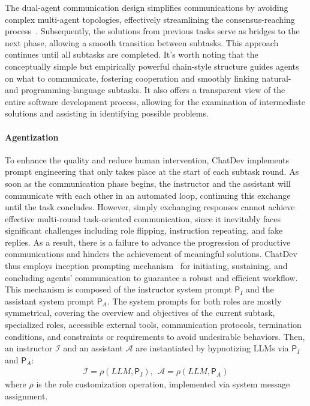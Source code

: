 \documentclass[11pt]{article}
\begin{document}
The dual-agent communication design simplifies communications by avoiding complex multi-agent topologies, effectively streamlining the consensus-reaching process~\cite{yin-etal-2023-exchange,chen2023agentverse}.
Subsequently, the solutions from previous tasks serve as bridges to the next phase, allowing a smooth transition between subtasks. This approach continues until all subtasks are completed.
It's worth noting that the conceptually simple but empirically powerful chain-style structure guides agents on what to communicate, fostering cooperation and smoothly linking natural- and programming-language subtasks.
It also offers a transparent view of the entire software development process, allowing for the examination of intermediate solutions and assisting in identifying possible problems.

\paragraph{Agentization}
To enhance the quality and reduce human intervention, ChatDev implements prompt engineering that only takes place at the start of each subtask round. As soon as the communication phase begins, the instructor and the assistant will communicate with each other in an automated loop, continuing this exchange until the task concludes.
However, simply exchanging responses cannot achieve effective multi-round task-oriented communication, since it inevitably faces significant challenges including role flipping, instruction repeating, and fake replies.
As a result, there is a failure to advance the progression of productive communications and hinders the achievement of meaningful solutions.
ChatDev thus employs inception prompting mechanism~\cite{li2023camel} for initiating, sustaining, and concluding agents' communication to guarantee a robust and efficient workflow.
This mechanism is composed of the instructor system prompt $\mathsf{P}_I$ and the assistant system prompt $\mathsf{P}_A$.
The system prompts for both roles are mostly symmetrical, covering the overview and objectives of the current subtask, specialized roles, accessible external tools, communication protocols, termination conditions, and constraints or requirements to avoid undesirable behaviors.
Then, an instructor $\mathcal{I}$ and an assistant $\mathcal{A}$ are instantiated by hypnotizing LLMs via $\mathsf{P}_I$ and $\mathsf{P}_A$:
\begin{equation}
\begin{aligned}
\mathcal{I} = \rho(LLM, \mathsf{P}_I), \ \ \mathcal{A} = \rho(LLM, \mathsf{P}_A)
\end{aligned}
\end{equation}
where $\rho$ is the role customization operation, implemented via system message assignment.
\end{document}
